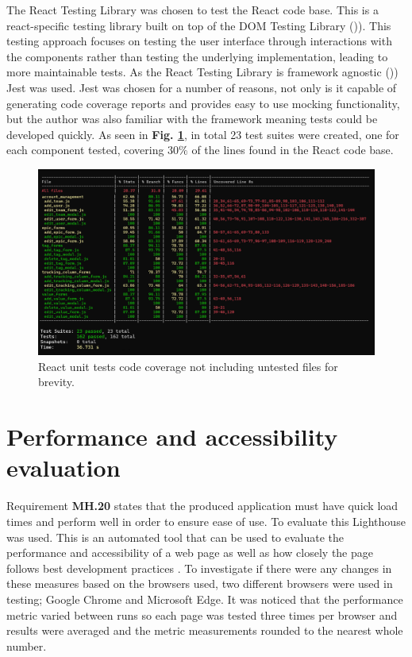 \documentclass[l4proj.tex]{subfiles}
\begin{document}
The React Testing Library was chosen to test the React code base. This is a react-specific testing library built on top of the DOM Testing Library (\cite{ReactTestingLibrary})). This testing approach focuses on testing the user interface through interactions with the components rather than testing the underlying implementation, leading to more maintainable tests. As the React Testing Library is framework agnostic (\cite{ReactTestingLibrary})) Jest was used. Jest was chosen for a number of reasons, not only is it capable of generating code coverage reports and provides easy to use mocking functionality, but the author was also familiar with the framework meaning tests could be developed quickly. As seen in  \textbf{Fig. \ref{fig:react unit tests}}, in total 23 test suites were created, one for each component tested, covering $30\%$ of the lines found in the React code base.

\begin{figure}[h!]
\begin{center}
\includegraphics[scale=0.4]{dissertation/images/ReactUnitTests.png}
\caption{React unit tests code coverage not including untested files for brevity.}
\label{fig:react unit tests} 
\end{center}
\end{figure}


\section{Performance and accessibility evaluation}
Requirement \textbf{MH.20} states that the produced application must have quick load times and perform well in order to ensure ease of use. To evaluate this Lighthouse was used. This is an automated tool that can be used to evaluate the performance and accessibility of a web page as well as how closely the page follows best development practices \cite{LighthouseOverview}. To investigate if there were any changes in these measures based on the browsers used, two different browsers were used in testing; Google Chrome and Microsoft Edge. It was noticed that the performance metric varied between runs so each page was tested three times per browser and results were averaged and the metric measurements rounded to the nearest whole number. 
\end{document}
